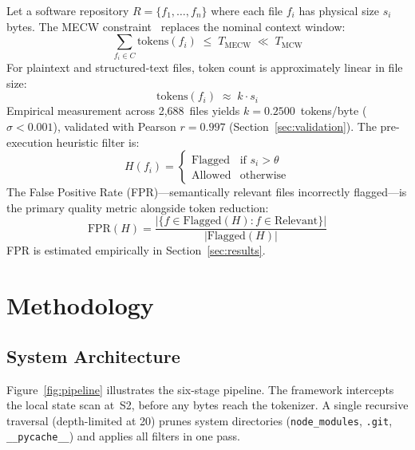 \documentclass[conference]{IEEEtran}
\begin{document}
Let a software repository $R = \{f_1, \ldots, f_n\}$ where each file
$f_i$ has physical size $s_i$ bytes. The MECW constraint~\cite{paulsen2025}
replaces the nominal context window:
\begin{equation}
  \sum_{f_i \in C} \mathrm{tokens}(f_i) \;\leq\; T_{\mathrm{MECW}}
  \;\ll\; T_{\mathrm{MCW}}
  \label{eq:mecw}
\end{equation}
For plaintext and structured-text files, token count is approximately
linear in file size:
\begin{equation}
  \mathrm{tokens}(f_i) \;\approx\; k \cdot s_i
  \label{eq:linear}
\end{equation}
Empirical measurement across 2,688~files yields
$k = 0.2500$~tokens/byte ($\sigma < 0.001$), validated with
Pearson $r = 0.997$ (Section~\ref{sec:validation}).
The pre-execution heuristic filter is:
\begin{equation}
  H(f_i) =
  \begin{cases}
    \text{Flagged} & \text{if } s_i > \theta \\
    \text{Allowed} & \text{otherwise}
  \end{cases}
  \label{eq:filter}
\end{equation}
The False Positive Rate (FPR)---semantically relevant files incorrectly
flagged---is the primary quality metric alongside token reduction:
\begin{equation}
  \mathrm{FPR}(H) = \frac{|\{f \in \mathrm{Flagged}(H) : f \in
  \mathrm{Relevant}\}|}{|\mathrm{Flagged}(H)|}
  \label{eq:fpr}
\end{equation}
FPR is estimated empirically in Section~\ref{sec:results}.

\section{Methodology}

\subsection{System Architecture}

Figure~\ref{fig:pipeline} illustrates the six-stage pipeline. The
framework intercepts the local state scan at~S2, before any bytes
reach the tokenizer. A single recursive traversal (depth-limited at 20)
prunes system directories (\texttt{node\_modules}, \texttt{.git},
\texttt{\_\_pycache\_\_}) and applies all filters in one pass.
\end{document}
